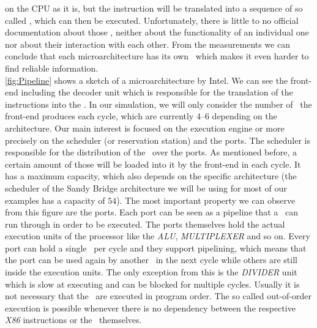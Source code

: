 on the CPU as it is, but the instruction will be translated into a sequence of so called \microops, which can then be executed. Unfortunately, there is little to no official documentation about those \microops, neither about the functionality of an individual one nor about their interaction with each other. From the measurements we can conclude that each microarchitecture has its own \microops\ which makes it even harder to find reliable information.\\ \autoref{fig:Pipeline} shows a sketch of a microarchitecture by Intel. We can see the front-end including the decoder unit which is responsible for the translation of the instructions into the \microops. In our simulation, we will only consider the number of \microops\ the front-end produces each cycle, which are currently $4$--$6$ depending on the architecture. Our main interest is focused on the execution engine or more precisely on the scheduler (or reservation station) and the ports. The scheduler is responsible for the distribution of the \microops\ over the ports. As mentioned before, a certain amount of those will be loaded into it by the front-end in each cycle. It has a maximum capacity, which also depends on the specific architecture (the scheduler of the Sandy Bridge architecture we will be using for most of our examples has a capacity of $54$). The most important property we can observe from this figure are the ports. Each port can be seen as a pipeline that a \microop\ can run through in order to be executed. The ports themselves hold the actual execution units of the processor like the \emph{ALU}, \emph{MULTIPLEXER} and so on. Every port can hold a single \microop\ per cycle and they support pipelining, which means that the port can be used again by another \microop\ in the next cycle while others are still inside the execution units. The only exception from this is the \emph{DIVIDER} unit which is slow at executing and can be blocked for multiple cycles. Usually it is not necessary that the \microops\ are executed in program order. The so called out-of-order execution is possible whenever there is no dependency between the respective \emph{X86} instructions or the \microops\ themselves.
 
 
 
 
